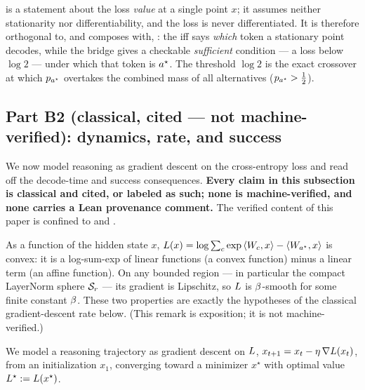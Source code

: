 \begin{remark}
\label{rem:bridge-scope}
 is a statement about the loss \emph{value} at a single point
$x$; it assumes neither stationarity nor differentiability, and the loss is never
differentiated. It is therefore orthogonal to, and composes with, : the iff says
\emph{which} token a stationary point decodes, while the bridge gives a checkable
\emph{sufficient} condition --- a loss below $\log 2$ --- under which that token is $a^{\star}$.
The threshold $\log 2$ is the exact crossover at which $p_{a^{\star}}$ overtakes the combined mass
of all alternatives ($p_{a^{\star}} > \tfrac12$).
\end{remark}

\subsection{Part B2 (classical, cited --- not machine-verified): dynamics, rate, and success}
\label{sec:dynamics-cited}

We now model reasoning as gradient descent on the cross-entropy loss and read off the
decode-time and success consequences. \textbf{Every claim in this subsection is classical and
cited, or labeled as such; none is machine-verified, and none carries a Lean provenance
comment.} The verified content of this paper is confined to 
and .

\begin{remark}
\label{rem:convex}
As a function of the hidden state $x$, $L(x) = \log\sum_{c}\exp\left\langle W_c, x \right\rangle - \left\langle W_{a^{\star}}, x \right\rangle$
is convex: it is a log-sum-exp of linear functions (a convex function) minus a linear term (an
affine function). On any bounded region --- in particular the compact LayerNorm sphere
$\mathcal{S}_r$ --- its gradient is Lipschitz, so $L$ is $\beta$-smooth for some finite constant
$\beta$. These two properties are exactly the hypotheses of the classical gradient-descent
rate below. (This remark is exposition; it is not machine-verified.)
\end{remark}

We model a reasoning trajectory as gradient descent on $L$,
$x_{t+1} = x_t - \eta\,\nabla L(x_t)$, from an initialization $x_1$, converging toward a
minimizer $x^{\star}$ with optimal value $L^{\star} := L(x^{\star})$.

